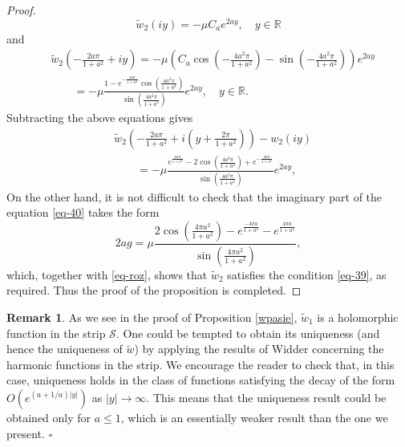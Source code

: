 \documentclass[11pt, letterpaper, reqno]{amsart}
\numberwithin{equation}{section}
\theoremstyle{definition}
\newtheorem{rem}[defi]{Remark}
\theoremstyle{plain}
\numberwithin{equation}{section}
\def\R{\mathbb{R}}
\def\SS{\mathcal{S}}
\begin{document}
\begin{proof}
\[
\tilde{w}_{2}(iy) = -\mu C_{a}e^{2ay}, \quad y\in\R
\]
and 
\begin{equation*}
\begin{aligned}
& \tilde{w}_{2}\left(-\frac{2a\pi}{1+a^2} + iy\right) = -\mu \left( C_{a}\cos\left(-\frac{4a^2\pi}{1+a^2}\right) - \sin\left(-\frac{4a^2\pi}{1+a^2}\right) \right)e^{2ay} \\
& \qquad = -\mu \frac{1 - e^{-\frac{4a\pi}{1+a^2}} \cos\left(\frac{4a^2\pi}{1+a^2}\right)}{\sin\left(\frac{4a^2\pi}{1+a^2}\right)} e^{2ay}, \quad y\in\R.
\end{aligned}
\end{equation*}
Subtracting the above equations gives
\begin{equation}
\begin{aligned}\label{eq-roz}
& \tilde{w}_{2}\left(-\frac{2a\pi}{1+a^2} + i\left(y + \frac{2\pi}{1+a^2}\right)\right) - w_{2}(iy)  \\
& \qquad = -\mu \frac{e^{\frac{4a\pi}{1+a^2}} -2\cos\left(\frac{4a^2\pi}{1+a^2}\right) + e^{-\frac{4a\pi}{1+a^2}}}{\sin\left(\frac{4a^2\pi}{1+a^2}\right)}e^{2ay},
\end{aligned}
\end{equation}
On the other hand, it is not difficult to check that the imaginary part of the equation \eqref{eq-40} takes the form
\begin{equation*}
2ag = \mu\frac{2\cos\left(\frac{4\pi a^2}{1+a^2}\right) - e^{\frac{-4\pi a}{1+a^2}} - e^{\frac{4\pi a}{1+a^2}}}{\sin\left(\frac{4\pi a^2}{1+a^2}\right)},
\end{equation*}
which, together with \eqref{eq-roz}, shows that $\tilde w_{2}$ satisfies the condition \eqref{eq-39}, as required. Thus the proof of the proposition is completed. 
\end{proof}
\begin{rem}
As we see in the proof of Proposition \ref{wpasie}, $\tilde{w}_1$ is a holomorphic function in the strip $\SS$. One could be tempted to obtain its uniqueness (and hence the uniqueness of $\tilde{w}$) by applying the results of Widder \cite{Widder} concerning the harmonic functions in the strip. We encourage the reader to check that, in this case, uniqueness holds in the class of functions satisfying the decay of the form $O(e^{(a+1/a)|y|})$ as $|y|\rightarrow \infty$. This means that the uniqueness result could be obtained only for $a\leq 1$, which is an essentially weaker result than the one we present. \hfill $\square$
\end{rem}
\end{document}
